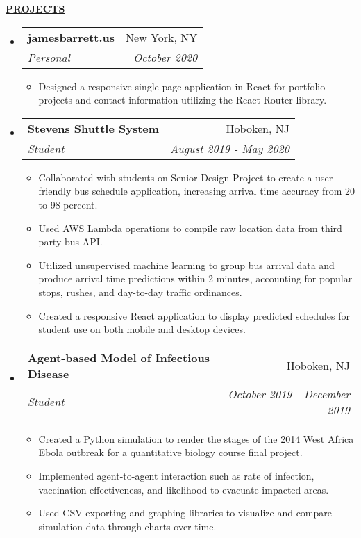 \documentclass[letterpaper,11pt]{article}
\makeatletter
\newcommand{\resheading}[1]{{{\begin{minipage}{\textwidth}{\textbf{#1 \vphantom{p\^{E}}}}\end{minipage}}}}
\newcommand{\ressubheading}[4]{
\begin{tabular*}{7.3in}{l@{\extracolsep{\fill}}r}
		\textbf{#1} & #2 \\
		\textit{#3} & \textit{#4} \\
\end{tabular*}\vspace{-6pt}}
\makeatother
\begin{document}
\resheading{\hspace{0em}\uline{\textsc{PROJECTS}\hfill}}
\begin{itemize}[leftmargin=*]
\item
	\ressubheading{jamesbarrett.us}{New York, NY}{Personal}{October 2020}
	\begin{itemize}[leftmargin=*]
		\item{Designed a responsive single-page application in React for portfolio projects and contact
information utilizing the React-Router library.}
		
	\end{itemize}
	
\item
	\ressubheading{Stevens Shuttle System}{Hoboken, NJ}{Student}{August 2019 - May 2020}
	\begin{itemize}[leftmargin=*]
		\item{Collaborated with students on Senior Design Project to create a user-friendly bus schedule application, increasing arrival time accuracy from 20 to 98 percent.}
		\item{Used AWS Lambda operations to compile raw location data from third party bus API.}
		\item{Utilized unsupervised machine learning to group bus arrival data and produce arrival time predictions within 2 minutes, accounting for popular stops, rushes, and day-to-day traffic ordinances.}
		\item{Created a responsive React application to display predicted schedules for student use on both mobile and desktop devices.}
	\end{itemize}

\item
	\ressubheading{Agent-based Model of Infectious Disease}{Hoboken, NJ}{Student}{October 2019 - December 2019}
	\begin{itemize}[leftmargin=*]
		\item{Created a Python simulation to render the stages of the 2014 West Africa Ebola outbreak for a quantitative biology course final project.}
		\item{Implemented agent-to-agent interaction such as rate of infection, vaccination effectiveness, and likelihood to evacuate impacted areas.
}		
		\item{Used CSV exporting and graphing libraries to visualize and compare simulation data through charts over time.}
		
	\end{itemize}
	
	
\end{itemize}
\end{document}
